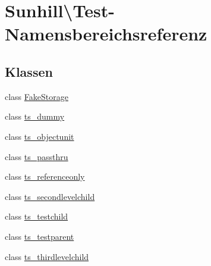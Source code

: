 \hypertarget{namespaceSunhill_1_1Test}{}\section{Sunhill\textbackslash{}Test-\/\+Namensbereichsreferenz}
\label{namespaceSunhill_1_1Test}
\subsection*{Klassen}
\begin{DoxyCompactItemize}
\item 
class \hyperlink{classSunhill_1_1Test_1_1FakeStorage}{Fake\+Storage}
\item 
class \hyperlink{classSunhill_1_1Test_1_1ts__dummy}{ts\+\_\+dummy}
\item 
class \hyperlink{classSunhill_1_1Test_1_1ts__objectunit}{ts\+\_\+objectunit}
\item 
class \hyperlink{classSunhill_1_1Test_1_1ts__passthru}{ts\+\_\+passthru}
\item 
class \hyperlink{classSunhill_1_1Test_1_1ts__referenceonly}{ts\+\_\+referenceonly}
\item 
class \hyperlink{classSunhill_1_1Test_1_1ts__secondlevelchild}{ts\+\_\+secondlevelchild}
\item 
class \hyperlink{classSunhill_1_1Test_1_1ts__testchild}{ts\+\_\+testchild}
\item 
class \hyperlink{classSunhill_1_1Test_1_1ts__testparent}{ts\+\_\+testparent}
\item 
class \hyperlink{classSunhill_1_1Test_1_1ts__thirdlevelchild}{ts\+\_\+thirdlevelchild}
\end{DoxyCompactItemize}
